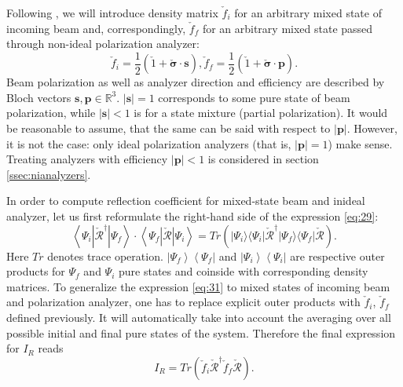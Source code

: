 \documentclass[12pt,a4paper]{article}
\begin{document}
Following \cite{toperverg}, we will introduce density matrix $\check{f}_i$ for an arbitrary mixed state of incoming beam and, correspondingly,
$\check{f}_f$ for an arbitrary mixed state passed through non-ideal polarization analyzer:
\begin{equation}
\check{f}_i = \frac{1}{2} \left(
\check{1} + \boldsymbol{\check{\sigma}} \cdot \boldsymbol{s}
\right),
\check{f}_f = \frac{1}{2} \left(
\check{1} + \boldsymbol{\check{\sigma}} \cdot \boldsymbol{p}
\right).
\end{equation}
Beam polarization as well as analyzer direction and efficiency are described by Bloch vectors $\boldsymbol{s}, \boldsymbol{p} \in \mathbb{R}^3$.  $|\boldsymbol{s}| = 1$ corresponds to some pure state of beam polarization, while $|\boldsymbol{s}| < 1$ is for a state mixture (partial polarization). It would be reasonable to assume, that the same can be said with respect to $|\boldsymbol{p}|$. However, it is not the case: only ideal polarization analyzers (that is, $|\boldsymbol{p}| = 1$) make sense. Treating analyzers with efficiency $|\boldsymbol{p}| < 1$ is considered in section \ref{ssec:nianalyzers}.

In order to compute reflection coefficient for mixed-state beam and inideal analyzer, let us first reformulate the right-hand side of
the expression \ref{eq:29}:
\begin{equation} \label{eq:31}
\left\langle \Psi_i | \check{\mathcal{R}}^{\dagger} | \Psi_f \right\rangle
\cdot
\left\langle \Psi_f | \check{\mathcal{R}} | \Psi_i \right\rangle
=
Tr \left(
| \Psi_i \rangle \langle \Psi_i | \check{\mathcal{R}}^{\dagger} | \Psi_f \rangle
\langle \Psi_f | \check{\mathcal{R}}
\right).
\end{equation}
Here $Tr$ denotes trace operation. $| \left. \Psi_f \right\rangle \left\langle \Psi_f \right. |$ and $| \left. \Psi_i \right\rangle \left\langle \Psi_i \right. |$ are respective outer products for $\Psi_f$ and $\Psi_i$ pure states and coinside with corresponding density matrices. To generalize the expression \ref{eq:31} to mixed states of incoming beam and polarization analyzer, one has to replace explicit outer products with $\check{f}_i$, $\check{f}_f$ defined previously. It will automatically take into account the averaging over all possible initial and final pure states of the system. Therefore the final expression for $I_R$ reads
\begin{equation} \label{eq:32}
I_R
=
Tr \left(
\check{f}_i \check{\mathcal{R}}^{\dagger} \check{f}_f \check{\mathcal{R}} 
\right).
\end{equation}
\end{document}
